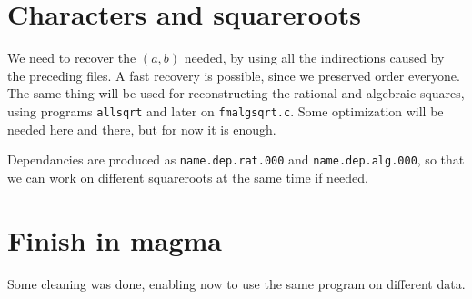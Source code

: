 \documentclass{article}
\begin{document}
\section{Characters and squareroots}

We need to recover the $(a, b)$ needed, by using all the indirections
caused by the preceding files. A fast recovery is possible, since we
preserved order everyone. The same thing will be used for
reconstructing the rational and algebraic squares, using programs
\verb+allsqrt+ and later on \verb+fmalgsqrt.c+. Some optimization will
be needed here and there, but for now it is enough. 

Dependancies are produced as \verb+name.dep.rat.000+ and
\verb+name.dep.alg.000+, so that we can work on different squareroots
at the same time if needed.

\section{Finish in magma}

Some cleaning was done, enabling now to use the same program on
different data.

\iffalse
\section{Deprecated stuff}

\subsection{procrels}

That is a very naive program whose aim is to get rid of singletons,
being either $5$ or a large prime (convenient, after all?).

It is naive in the way it is programmed: first build a big table of
all primes occurring in relations, then sort it, then crunch it to get
rid of duplicates!!!! No hashing is performed.

This program cannot be used as the basis of the filtering step, so
that everything has to be written from scratch!

All the relations are to fit in core memory!!

Programming leads to potentially very slow computations, since many
operations are done slowly.
\fi
\end{document}
